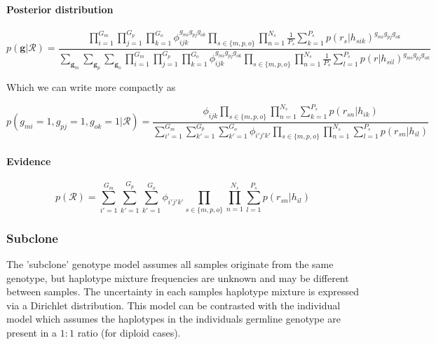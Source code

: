 \documentclass{article}
\begin{document}
\paragraph{Posterior distribution}

\begin{equation}
 p(\boldsymbol{g} | \mathcal{R}) = \frac{\prod_{i = 1}^{G_m}\prod_{j = 1}^{G_p}\prod_{k = 1}^{G_o} \phi_{ijk}^{g_{mi} g_{pj} g_{ok}} \prod_{s \in \{m, p, o \}} \prod^{N_s}_{n = 1} \frac{1}{P_s} \sum^{P_s}_{k = 1} p(r_s | h_{sik})^{g_{mi} g_{pj} g_{ok}}}{\sum_{\boldsymbol{g}_m} \sum_{\boldsymbol{g}_p} \sum_{\boldsymbol{g}_o} \prod_{i = 1}^{G_m}\prod_{j = 1}^{G_p}\prod_{k = 1}^{G_o} \phi_{ijk}^{g_{mi} g_{pj} g_{ok}} \prod_{s \in \{m, p, o \}} \prod^{N_s}_{n = 1} \frac{1}{P_s} \sum^{P_s}_{l = 1} p(r | h_{sil})^{g_{mi} g_{pj} g_{ok}}}
\end{equation}

Which we can write more compactly as

\begin{equation}
 p(g_{mi} = 1, g_{pj} = 1, g_{ok} = 1 | \mathcal{R}) = \frac{\phi_{ijk}  \prod_{s \in \{m, p, o \}} \prod^{N_s}_{n = 1} \sum^{P_s}_{k = 1} p(r_{sn} | h_{ik})}{\sum_{i' = 1}^{G_m} \sum_{k' = 1}^{G_p} \sum_{k' = 1}^{G_o} \phi_{i'j'k'} \prod_{s \in \{m, p, o \}} \prod^{N_s}_{n = 1} \sum^{P_s}_{l = 1} p(r_{sn} | h_{il})}
\end{equation}

\paragraph{Evidence}

\begin{equation}
 p(\mathcal{R}) = \sum_{i' = 1}^{G_m} \sum_{k' = 1}^{G_p} \sum_{k' = 1}^{G_o} \phi_{i'j'k'} \prod_{s \in \{m, p, o \}} \prod^{N_s}_{n = 1} \sum^{P_s}_{l = 1} p(r_{sn} | h_{il})
\end{equation}

\subsubsection{Subclone}\label{model:subclone}

The 'subclone' genotype model assumes all samples originate from the same genotype, but haplotype mixture frequencies are unknown and may be different between samples. The uncertainty in each samples haplotype mixture is expressed via a Dirichlet distribution. This model can be contrasted with the individual model which assumes the haplotypes in the individuals germline genotype are present in a $1:1$ ratio (for diploid cases).
\end{document}
